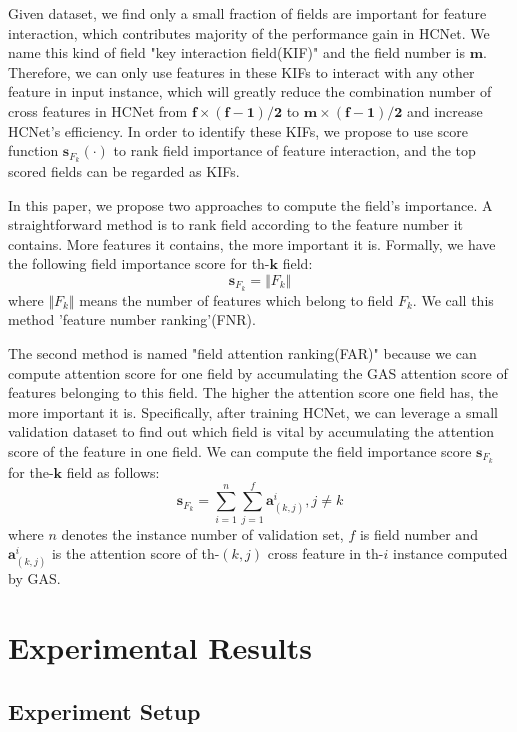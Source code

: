 \documentclass[sigconf,authorversion]{acmart}
\begin{document}
Given dataset, we find only a small fraction of fields are important for feature interaction, which contributes majority of the performance gain in HCNet. We name this kind of field "key interaction field(KIF)" and the field number is $\mathbf{m}$. Therefore, we can only use features in these KIFs to interact with any other feature in input instance, which will greatly reduce the combination number of cross features in HCNet from  $\mathbf{f \times(f-1)/2}$ to $\mathbf{m\times(f-1)/2}$ and increase HCNet's efficiency. In order to identify these KIFs, we propose to use score function  $ \mathbf{s}_{F_k}(\cdot)$  to rank field importance of feature interaction, and the top scored fields can be regarded as KIFs.

In this paper, we propose two approaches to compute the field's importance. A straightforward method is to rank field according to the feature number it contains. More features it contains, the more important it is. Formally, we have the following field importance score for th-$\mathbf{k}$ field:
 \begin{equation}
         \mathbf{s}_{F_k} = \Vert F_k \Vert
 \end{equation}
where $\Vert F_k \Vert$ means the number of features which belong to field $F_k$. We call this method 'feature number ranking'(FNR).

The second method is named "field attention ranking(FAR)" because we can compute attention score for one field by accumulating the GAS attention score of features belonging to this field. The higher the attention score one field has, the more important it is. Specifically, after training HCNet, we can leverage a small validation dataset to find out which field is vital by accumulating the attention score of the feature in one field. We can compute the field importance score $\mathbf{s}_{F_k}$ for the-$\mathbf{k}$ field as follows:
 \begin{equation}
         \mathbf{s}_{F_k} = \sum_{i=1}^{n}\sum_{j=1}^{f}\mathbf{a}_{(k,j)}^i , j \neq k
 \end{equation}
where $n$ denotes the instance number of validation set, $f$ is field number and $\mathbf{a}_{(k,j)}^i$ is the attention score of th-$(k,j)$ cross feature in th-$i$ instance computed by GAS.


\section{Experimental Results}

\subsection{Experiment Setup}
\end{document}
